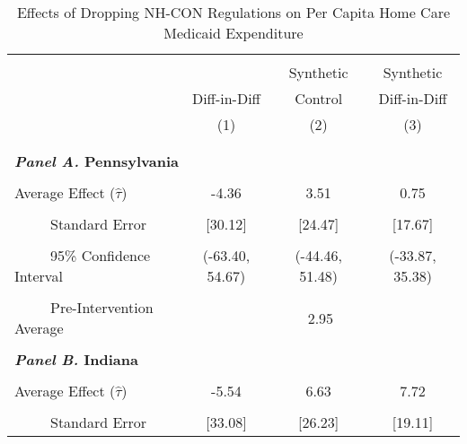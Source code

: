 \documentclass[12pt]{article}
\begin{document}
\null
\vfill
\begin{table}[htbp]\centering \footnotesize
\def\sym#1{\ifmmode^{#1}\else\(^{#1}\)\fi}
\captionsetup{width=.8\textwidth}
\caption{\centering Effects of Dropping NH-CON Regulations on Per Capita Home Care Medicaid Expenditure}
\label{tab:ave_results_med_homecare_exp_nobord_nocon}
\setlength{\tabcolsep}{10pt}
\begin{tabular}{l*{3}{c}}
\hline\hline
\\[-2ex]
&\multicolumn{1}{c}{}&\multicolumn{1}{c}{Synthetic}&\multicolumn{1}{c}{Synthetic}\\
&\multicolumn{1}{c}{Diff-in-Diff}&\multicolumn{1}{c}{Control}&\multicolumn{1}{c}{Diff-in-Diff}\\
&\multicolumn{1}{c}{(1)}&\multicolumn{1}{c}{(2)}&\multicolumn{1}{c}{(3)}\\
\\[-2ex]
\hline
\\[-.1ex]
\multicolumn{4}{l}{\textbf{\textit{Panel A.} Pennsylvania}}\\
\\[-1.5ex]
\multicolumn{1}{l}{Average Effect ($\hat{\tau}$)}&   \multicolumn{1}{c}{-4.36}&   \multicolumn{1}{c}{3.51}&  \multicolumn{1}{c}{0.75}\\
\\[-2ex]
\multicolumn{1}{l}{\ \ \ \ \ Standard Error}  &\multicolumn{1}{c}{[30.12]}&\multicolumn{1}{c}{[24.47]}&\multicolumn{1}{c}{[17.67]}\\
\\[-2ex]
\multicolumn{1}{l}{\ \ \ \ \ 95\% Confidence Interval}&   \multicolumn{1}{c}{(-63.40, 54.67)}&   \multicolumn{1}{c}{(-44.46, 51.48)}&   \multicolumn{1}{c}{(-33.87, 35.38)}\\
\\[-2ex]
\multicolumn{1}{l}{\ \ \ \ \ Pre-Intervention Average}&   \multicolumn{3}{c}{2.95}\\
\\[-.1ex]
\multicolumn{4}{l}{\textbf{\textit{Panel B.} Indiana}}\\
\\[-1.5ex]
\multicolumn{1}{l}{Average Effect ($\hat{\tau}$)}&   \multicolumn{1}{c}{-5.54}&   \multicolumn{1}{c}{6.63}&  \multicolumn{1}{c}{7.72}\\
\\[-2ex]
\multicolumn{1}{l}{\ \ \ \ \ Standard Error}  &\multicolumn{1}{c}{[33.08]}&\multicolumn{1}{c}{[26.23]}&\multicolumn{1}{c}{[19.11]}\\

\end{tabular}
\end{table}
\end{document}
